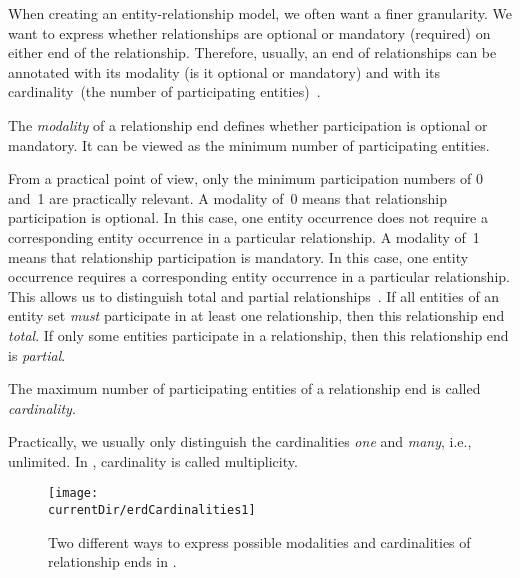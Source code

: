 When creating an entity-relationship model, we often want a finer granularity.
We want to express whether relationships are optional or mandatory (required) on either end of the relationship.
Therefore, usually, an end of relationships can be annotated with its modality (is it optional or mandatory) and with its cardinality~(the number of participating entities)~\cite{R2024CDS:E}.
%
\begin{definition}
The \emph{modality} of a relationship end defines whether participation is optional or mandatory. %
It can be viewed as the minimum number of participating entities.%
\end{definition}%
%
From a practical point of view, only the minimum participation numbers of 0 and~1 are practically relevant.
A modality of~0 means that relationship participation is optional.
In this case, one entity occurrence does not require a corresponding entity occurrence in a particular relationship.
A modality of~1 means that relationship participation is mandatory.
In this case, one entity occurrence requires a corresponding entity occurrence in a particular relationship.
This allows us to distinguish total and partial relationships~\cite{P2006CITRD:ERMI,V1999C5DMS:CDUTERM}.
If all entities of an entity set \emph{must} participate in at least one relationship, then this relationship end \emph{total}.
If only some entities participate in a relationship, then this relationship end is \emph{partial}.
%
\begin{definition}
The maximum number of participating entities of a relationship end is called \emph{cardinality}.%
\end{definition}%
%
Practically, we usually only distinguish the cardinalities \emph{one} and \emph{many}, i.e., unlimited.%
In , cardinality is called multiplicity.

\begin{figure}%
\centering%
\texttt{[image: \\currentDir/erdCardinalities1]}%
\caption{Two different ways to express possible modalities and cardinalities of relationship ends in .}%
\label{fig:erdCardinalities1}%
\end{figure}%

